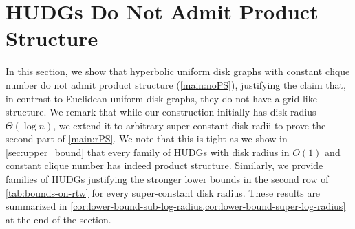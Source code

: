 \documentclass[a4paper,english,cleveref,thm-restate]{lipics-v2021}
\newcommand{\Thomas}[1]{\todo[inline,caption=,backgroundcolor=blue!25]{#1}}
\newcommand{\calG}{\ensuremath{\mathcal{G}}\xspace}
\begin{document}
% 


 
\section{HUDGs Do Not Admit Product Structure}
\label{sec:large_radii}
\label{sec:lower_bound}

%     

In this section, we show that hyperbolic uniform disk graphs with constant clique number do not admit product structure (\cref{main:noPS}), justifying the claim that, in contrast to Euclidean uniform disk graphs, they do not have a grid-like structure.
We remark that while our construction initially has disk radius $ \Theta(\log n) $, 
we extend it to arbitrary super-constant disk radii to prove the second part of \cref{main:rPS}.
We note that this is tight as we show in \cref{sec:upper_bound} that every family of HUDGs with disk radius in $O(1)$ and constant clique number has indeed product structure.
Similarly, we provide families of HUDGs justifying the stronger lower bounds in the second row of \cref{tab:bounds-on-rtw} for every super-constant disk radius.
These results are summarized in \cref{cor:lower-bound-sub-log-radius,cor:lower-bound-super-log-radius} at the end of the section.


\end{document}

